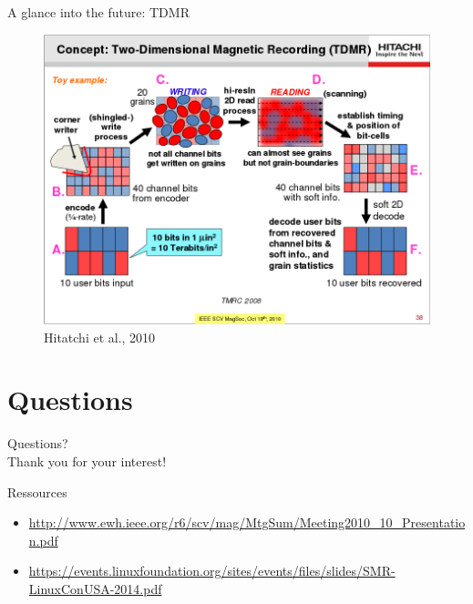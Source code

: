 \documentclass[12pt]{beamer}
\newlength{\wideitemsep}
\let\olditem\item
\renewcommand{\item}{\setlength{\itemsep}{\wideitemsep}\olditem}
\begin{document}
\begin{frame}[fragile]{A glance into the future: TDMR}
	\begin{figure}[p]
		\centering
		\includegraphics[width=0.85\linewidth]{img/hdd_2d_slides.png}
		\caption{Hitatchi et al., 2010}
	\end{figure}
\end{frame}

\section{Questions}
\begin{frame}[standout]
	Questions? \\
	Thank you for your interest!
\end{frame}

\begin{frame}[fragile]{Ressources}
	\begin{itemize}
		\item \url{http://www.ewh.ieee.org/r6/scv/mag/MtgSum/Meeting2010_10_Presentation.pdf}
		\item \url{https://events.linuxfoundation.org/sites/events/files/slides/SMR-LinuxConUSA-2014.pdf}
	\end{itemize}
\end{frame}
\end{document}
